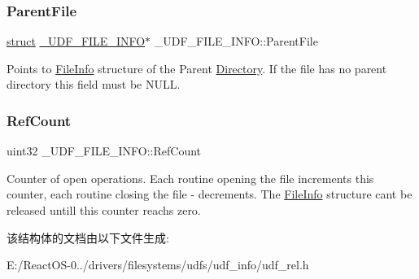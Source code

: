 \subsubsection{\texorpdfstring{Parent\+File}{ParentFile}}
{\footnotesize\ttfamily \hyperlink{interfacestruct}{struct} \hyperlink{struct___u_d_f___f_i_l_e___i_n_f_o}{\+\_\+\+U\+D\+F\+\_\+\+F\+I\+L\+E\+\_\+\+I\+N\+FO}$\ast$ \+\_\+\+U\+D\+F\+\_\+\+F\+I\+L\+E\+\_\+\+I\+N\+F\+O\+::\+Parent\+File}

Points to \hyperlink{struct_file_info}{File\+Info} structure of the Parent \hyperlink{struct_directory}{Directory}. If the file has no parent directory this field must be N\+U\+LL. \mbox{\label{struct___u_d_f___f_i_l_e___i_n_f_o_a85481e6f042f1a009a946726bff601d7}} 
\subsubsection{\texorpdfstring{Ref\+Count}{RefCount}}
{\footnotesize\ttfamily uint32 \+\_\+\+U\+D\+F\+\_\+\+F\+I\+L\+E\+\_\+\+I\+N\+F\+O\+::\+Ref\+Count}

Counter of open operations. Each routine opening the file increments this counter, each routine closing the file -\/ decrements. The \hyperlink{struct_file_info}{File\+Info} structure can\textquotesingle{}t be released untill this counter reachs zero. 

该结构体的文档由以下文件生成\+:\begin{DoxyCompactItemize}
\item 
E\+:/\+React\+O\+S-\/0../drivers/filesystems/udfs/udf\+\_\+info/udf\+\_\+rel.\+h\end{DoxyCompactItemize}
